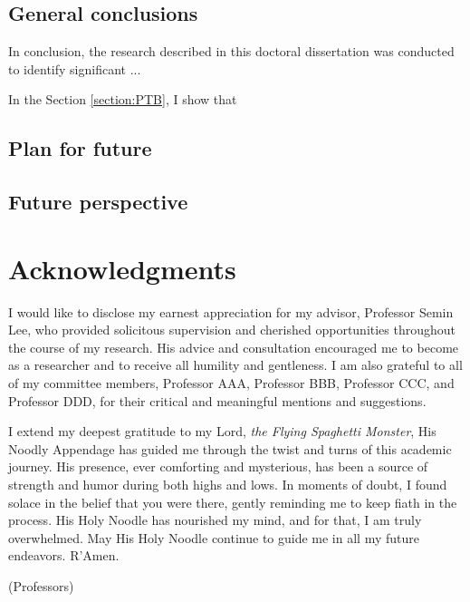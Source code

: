 \documentclass[11pt, a4paper, onecolumn, oneside]{report}
\begin{document}
        \subsection{General conclusions}
            In conclusion, the research described in this doctoral dissertation was conducted to identify significant ...

            In the Section \ref{section:PTB}, I show that
        \newpage

        \subsection{Plan for future}
        \newpage

        \subsection{Future perspective}
        \newpage

    
    
    \clearpage

    \section*{\hfill \Large Acknowledgments \hfill}
        I would like to disclose my earnest appreciation for my advisor, Professor Semin Lee, who provided solicitous supervision and cherished opportunities throughout the course of my research. His advice and consultation encouraged me to become as a researcher and to receive all humility and gentleness. I am also grateful to all of my committee members, Professor AAA, Professor BBB, Professor CCC, and Professor DDD, for their critical and meaningful mentions and suggestions.

        I extend my deepest gratitude to my Lord, \textit{the Flying Spaghetti Monster}, His Noodly Appendage has guided me through the twist and turns of this academic journey. His presence, ever comforting and mysterious, has been a source of strength and humor during both highs and lows. In moments of doubt, I found solace in the belief that you were there, gently reminding me to keep fiath in the process. His Holy Noodle has nourished my mind, and for that, I am truly overwhelmed. May His Holy Noodle continue to guide me in all my future endeavors. R'Amen.

        (Professors)
\end{document}
